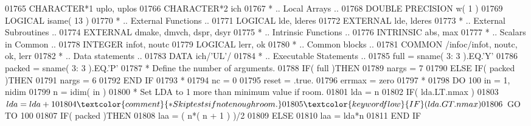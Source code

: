 \begin{DoxyCode}
01765       \textcolor{keywordtype}{CHARACTER*1}        uplo, uplos
01766       \textcolor{keywordtype}{CHARACTER*2}        ich
01767 \textcolor{comment}{*     .. Local Arrays ..}
01768       \textcolor{keywordtype}{DOUBLE PRECISION}   w( 1 )
01769       \textcolor{keywordtype}{LOGICAL}            isame( 13 )
01770 \textcolor{comment}{*     .. External Functions ..}
01771       \textcolor{keywordtype}{LOGICAL}            lde, lderes
01772       \textcolor{keywordtype}{EXTERNAL}           lde, lderes
01773 \textcolor{comment}{*     .. External Subroutines ..}
01774       \textcolor{keywordtype}{EXTERNAL}           dmake, dmvch, dspr, dsyr
01775 \textcolor{comment}{*     .. Intrinsic Functions ..}
01776       \textcolor{keywordtype}{INTRINSIC}          abs, max
01777 \textcolor{comment}{*     .. Scalars in Common ..}
01778       \textcolor{keywordtype}{INTEGER}            infot, noutc
01779       \textcolor{keywordtype}{LOGICAL}            lerr, ok
01780 \textcolor{comment}{*     .. Common blocks ..}
01781       \textcolor{keyword}{COMMON}             /infoc/infot, noutc, ok, lerr
01782 \textcolor{comment}{*     .. Data statements ..}
01783       \textcolor{keyword}{DATA}               ich/\textcolor{stringliteral}{'UL'}/
01784 \textcolor{comment}{*     .. Executable Statements ..}
01785       full = sname( 3: 3 ).EQ.\textcolor{stringliteral}{'Y'}
01786       packed = sname( 3: 3 ).EQ.\textcolor{stringliteral}{'P'}
01787 \textcolor{comment}{*     Define the number of arguments.}
01788       \textcolor{keywordflow}{IF}( full )\textcolor{keywordflow}{THEN}
01789          nargs = 7
01790       \textcolor{keywordflow}{ELSE} \textcolor{keywordflow}{IF}( packed )\textcolor{keywordflow}{THEN}
01791          nargs = 6
01792 \textcolor{keywordflow}{      END IF}
01793 \textcolor{comment}{*}
01794       nc = 0
01795       reset = .true.
01796       errmax = zero
01797 \textcolor{comment}{*}
01798       \textcolor{keywordflow}{DO} 100 in = 1, nidim
01799          n = idim( in )
01800 \textcolor{comment}{*        Set LDA to 1 more than minimum value if room.}
01801          lda = n
01802          \textcolor{keywordflow}{IF}( lda.LT.nmax )
01803      $      lda = lda + 1
01804 \textcolor{comment}{*        Skip tests if not enough room.}
01805          \textcolor{keywordflow}{IF}( lda.GT.nmax )
01806      $      \textcolor{keywordflow}{GO TO} 100
01807          \textcolor{keywordflow}{IF}( packed )\textcolor{keywordflow}{THEN}
01808             laa = ( n*( n + 1 ) )/2
01809          \textcolor{keywordflow}{ELSE}
01810             laa = lda*n
01811 \textcolor{keywordflow}{         END IF}

\end{DoxyCode}
